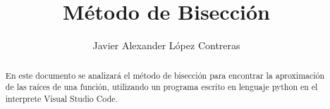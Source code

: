 \documentclass{rmf-d}
\begin{document}




\title{Método de Bisección
\vspace{-6pt}}
\author{Javier Alexander López Contreras }

\address{Facultad de Ciencias Físico Matemáticas (FCFM), Universidad Autónoma de Coahuila, Campus Campo redondo }
\\

\maketitle




\begin{center}
\end{center}


\begin{abstract}
En este documento se analizará el método de bisección para encontrar la aproximación de las raíces de una función, utilizando un programa escrito en lenguaje python en el interprete Visual Studio Code.
\end{abstract}
\end{document}
